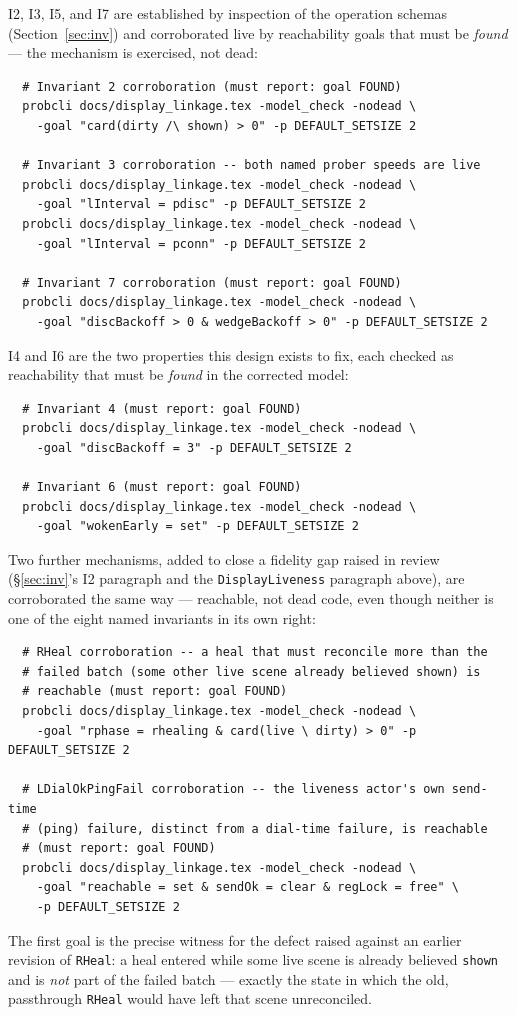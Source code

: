 \documentclass[a4paper,10pt,fleqn]{article}
\begin{document}
I2, I3, I5, and I7 are established by inspection of the operation schemas
(Section~\ref{sec:inv}) and corroborated live by reachability goals that
must be \emph{found} --- the mechanism is exercised, not dead:
\begin{verbatim}
  # Invariant 2 corroboration (must report: goal FOUND)
  probcli docs/display_linkage.tex -model_check -nodead \
    -goal "card(dirty /\ shown) > 0" -p DEFAULT_SETSIZE 2

  # Invariant 3 corroboration -- both named prober speeds are live
  probcli docs/display_linkage.tex -model_check -nodead \
    -goal "lInterval = pdisc" -p DEFAULT_SETSIZE 2
  probcli docs/display_linkage.tex -model_check -nodead \
    -goal "lInterval = pconn" -p DEFAULT_SETSIZE 2

  # Invariant 7 corroboration (must report: goal FOUND)
  probcli docs/display_linkage.tex -model_check -nodead \
    -goal "discBackoff > 0 & wedgeBackoff > 0" -p DEFAULT_SETSIZE 2
\end{verbatim}

I4 and I6 are the two properties this design exists to fix, each checked as
reachability that must be \emph{found} in the corrected model:
\begin{verbatim}
  # Invariant 4 (must report: goal FOUND)
  probcli docs/display_linkage.tex -model_check -nodead \
    -goal "discBackoff = 3" -p DEFAULT_SETSIZE 2

  # Invariant 6 (must report: goal FOUND)
  probcli docs/display_linkage.tex -model_check -nodead \
    -goal "wokenEarly = set" -p DEFAULT_SETSIZE 2
\end{verbatim}

Two further mechanisms, added to close a fidelity gap raised in review
(\S\ref{sec:inv}'s I2 paragraph and the \texttt{DisplayLiveness} paragraph
above), are corroborated the same way --- reachable, not dead code, even
though neither is one of the eight named invariants in its own right:
\begin{verbatim}
  # RHeal corroboration -- a heal that must reconcile more than the
  # failed batch (some other live scene already believed shown) is
  # reachable (must report: goal FOUND)
  probcli docs/display_linkage.tex -model_check -nodead \
    -goal "rphase = rhealing & card(live \ dirty) > 0" -p DEFAULT_SETSIZE 2

  # LDialOkPingFail corroboration -- the liveness actor's own send-time
  # (ping) failure, distinct from a dial-time failure, is reachable
  # (must report: goal FOUND)
  probcli docs/display_linkage.tex -model_check -nodead \
    -goal "reachable = set & sendOk = clear & regLock = free" \
    -p DEFAULT_SETSIZE 2
\end{verbatim}
The first goal is the precise witness for the defect raised against an
earlier revision of \texttt{RHeal}: a heal entered while some live scene
is already believed \texttt{shown} and is \emph{not} part of the failed
batch --- exactly the state in which the old, passthrough \texttt{RHeal}
would have left that scene unreconciled.
\end{document}
